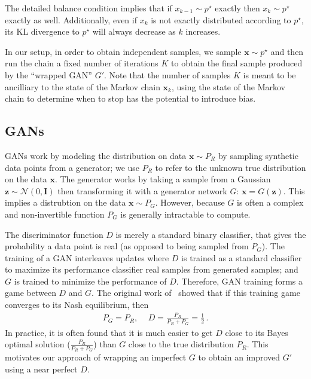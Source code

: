 \documentclass{article}
\renewcommand{\vec}[1]{{\boldsymbol{\mathbf{#1}}}} %
\newcommand{\mat}[1]{{\ensuremath{\mathbf{#1}}}} %
\newcommand{\sample}{\sim}
\newcommand{\norm}{\mathcal{N}}
\newcommand{\target}{{p^\star}}
\begin{document}
The detailed balance condition implies that if $x_{k-1} \sample \target$ exactly then $x_k \sample \target$ exactly as well.
Additionally, even if $x_k$ is not exactly distributed according to $\target$, its KL divergence to $\target$ will always decrease as $k$ increases.  %

In our setup, in order to obtain independent samples, we sample $\vec x \sample \target$ and then run the chain a fixed number of iterations $K$ to obtain the final sample produced by the ``wrapped GAN'' $G'$.
Note that the number of samples $K$ is meant to be ancilliary to the state of the Markov chain $\vec x_k$, using the state of the Markov chain to determine when to stop has the potential to introduce bias.  %

\subsection{GANs}

GANs work by modeling the distribution on data $\vec x \sample P_R$ by sampling synthetic data points from a generator; we use $P_R$ to refer to the unknown true distribution on the data $\vec x$.
The generator works by taking a sample from a Gaussian $\vec z \sample \norm(0,\mat I)$ then transforming it with a generator network $G$: $\vec x = G(\vec z)$.
This implies a distrubtion on the data $\vec x \sample P_G$.  %
However, because $G$ is often a complex and non-invertible function $P_G$ is generally intractable to compute.

The discriminator function $D$ is merely a standard binary classifier, that gives the probability a data point is real (as opposed to being sampled from $P_G$)\@.
The training of a GAN interleaves updates where $D$ is trained as a standard classifier to maximize its performance classifier real samples from generated samples; and $G$ is trained to minimize the performance of $D$.
Therefore, GAN training forms a game between $D$ and $G$.
The original work of~\citet{} showed that if this training game converges to its Nash equilibrium, then
\begin{align}
  P_G = P_R,\, \quad D = \frac{P_R}{P_R + P_G} = \frac{1}{2}\,.
\end{align}
In practice, it is often found that it is much easier to get $D$ close to its Bayes optimal solution ($\frac{P_R}{P_R + P_G}$) than $G$ close to the true distribution $P_R$.
This motivates our approach of wrapping an imperfect $G$ to obtain an improved $G'$ using a near perfect $D$.
\end{document}
